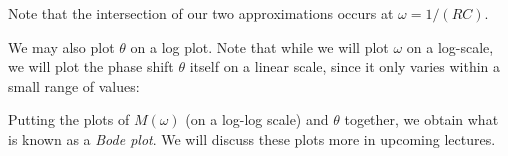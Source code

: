\documentclass[letterpaper]{article}
\theoremstyle{remark}
\begin{document}
Note that the intersection of our two approximations occurs at $\omega = 1 / (RC)$.

We may also plot $\theta$ on a log plot. Note that while we will plot $\omega$ on a log-scale, we will plot the phase shift $\theta$ itself on a linear scale, since it only varies within a small range of values:
\begin{center}
\end{center}

Putting the plots of $M(\omega)$ (on a log-log scale) and $\theta$ together, we obtain what is known as a \emph{Bode plot}. We will discuss these plots more in upcoming lectures.
\end{document}
